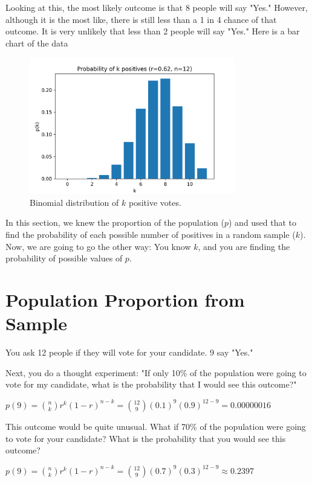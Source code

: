 Looking at this, the most likely outcome is that 8 people will say "Yes." However, although it is the most like, there is still less than a 1 in 4 chance of that outcome. It is very unlikely that less than 2 people will say "Yes." 
Here is a bar chart of the data
\begin{figure}[htbp]
  \centering
  \includegraphics[width=0.8\textwidth]{binomial_dist.png}
  \caption{Binomial distribution of $k$ positive votes.}
  \label{fig:binomial_dist}
\end{figure}

In this section, we knew the proportion of the population ($p$) and used that to find the probability of each possible number of positives in a random sample ($k$). 
Now, we are going to go the other way: You know $k$, and you are finding the probability of possible values of $p$.


\section{Population Proportion from Sample}

You ask 12 people if they will vote for your candidate. 9 say "Yes."

Next, you do a thought experiment: "If only 10\% of the population were going to vote for my candidate, what is the probability that I would see this outcome?"

$p(9) = \binom{n}{k}r^k(1-r)^{n-k} = \binom{12}{9}(0.1)^9 (0.9)^{12-9} = 0.00000016$

This outcome would be quite unusual. What if 70\% of the population were going to vote for your candidate? What is the probability that you would see this outcome?

$p(9) = \binom{n}{k}r^k(1-r)^{n-k} = \binom{12}{9}(0.7)^9 (0.3)^{12-9} \approx 0.2397$


